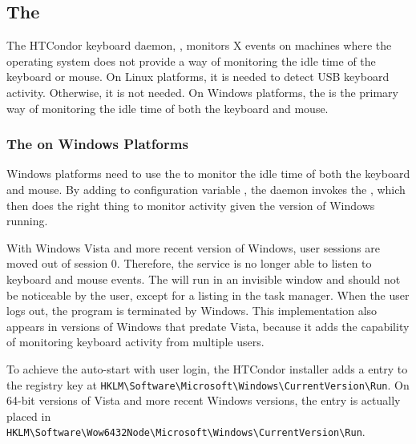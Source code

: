 \subsection{\label{sec:kbdd}The }

The HTCondor keyboard daemon, , monitors X events on
machines where the operating system does not provide a way of
monitoring the idle time of the keyboard or mouse.  
On Linux platforms,
it is needed to detect USB keyboard activity.
Otherwise, it is not needed.  
On Windows platforms,
the  is the primary way of monitoring the idle time of 
both the keyboard and mouse.

\subsubsection{\label{sec:kbdd-Windows}The  on Windows Platforms}

Windows platforms need to use the  to monitor the
idle time of both the keyboard and mouse.
By adding  to configuration variable ,
the  daemon invokes the ,
which then does the right thing to monitor activity given the
version of Windows running.

With Windows Vista and more recent version of Windows,
user sessions are moved out of session 0.
Therefore, the  service is no longer able to listen 
to keyboard and mouse events.
The  will run in an invisible
window and should not be noticeable by the user,
except for a listing in the task manager. 
When the user logs out, the program is terminated by Windows. 
This implementation also appears in versions of Windows that predate Vista,
because it adds the capability of monitoring keyboard activity
from multiple users.

To achieve the auto-start with user login, the HTCondor installer adds a
 entry to the registry key at
\verb|HKLM\Software\Microsoft\Windows\CurrentVersion\Run|. 
On 64-bit versions of Vista and more recent Windows versions,
the entry is actually placed in
\verb|HKLM\Software\Wow6432Node\Microsoft\Windows\CurrentVersion\Run|.  

